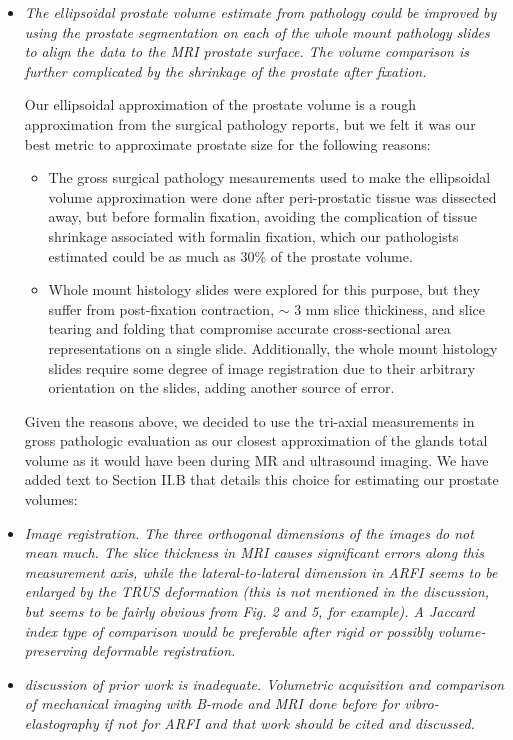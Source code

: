 \documentclass[10pt]{article}
\begin{document}
\begin{itemize}
    \item \textit{The ellipsoidal prostate volume estimate from pathology could be
        improved by using the prostate segmentation on each of the whole mount
        pathology slides to align the data to the MRI prostate surface. The
        volume comparison is further complicated by the shrinkage of the
        prostate after fixation.}

   Our ellipsoidal approximation of the prostate volume is a rough
   approximation from the surgical pathology reports, but we felt it was our
   best metric to approximate prostate size for the following reasons:

   \begin{itemize}
        \item The gross surgical pathology mesaurements used to make the
            ellipsoidal volume approximation were done after peri-prostatic
            tissue was dissected away, but before formalin fixation, avoiding
            the complication of tissue shrinkage associated with formalin
            fixation, which our pathologists estimated could be as much as 30\%
            of the prostate volume.
        \item Whole mount histology slides were explored for this purpose, but
            they suffer from post-fixation contraction, $\sim$ 3 mm slice
            thickiness, and slice tearing and folding that compromise accurate
            cross-sectional area representations on a single slide.
            Additionally, the whole mount histology slides require some degree
            of image registration due to their arbitrary orientation on the
            slides, adding another source of error.
    \end{itemize}

    Given the reasons above, we decided to use the tri-axial measurements in
    gross pathologic evaluation as our closest approximation of the glands
    total volume as it would have been during MR and ultrasound imaging.  We
    have added text to Section II.B that details this choice for estimating our
    prostate volumes:

    \textbf{}

    \item \textit{Image registration. The three orthogonal dimensions of the
            images do not mean much. The slice thickness in MRI causes
            significant errors along this measurement axis, while the
            lateral-to-lateral dimension in ARFI seems to be enlarged by the
            TRUS deformation (this is not mentioned in the discussion, but
            seems to be fairly obvious from Fig. 2 and 5, for example). A
            Jaccard index type of comparison would be preferable after rigid or
            possibly volume-preserving deformable registration.}

    \item \textit{discussion of prior work is inadequate. Volumetric
            acquisition and comparison of mechanical imaging with B-mode and
            MRI done before for vibro-elastography if not for ARFI and that
            work should be cited and discussed.}
\end{itemize}
\end{document}
